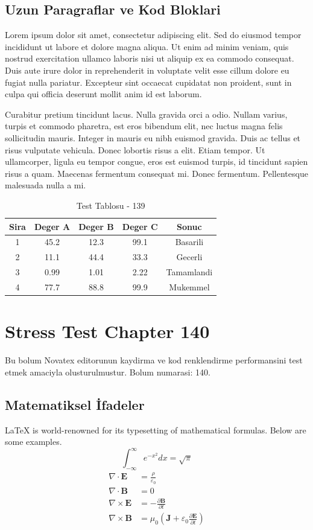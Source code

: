 \documentclass[12pt,a4paper]{article}
\begin{document}
\subsection{Uzun Paragraflar ve Kod Bloklari}
Lorem ipsum dolor sit amet, consectetur adipiscing elit. Sed do eiusmod tempor incididunt ut labore et dolore magna aliqua. Ut enim ad minim veniam, quis nostrud exercitation ullamco laboris nisi ut aliquip ex ea commodo consequat. Duis aute irure dolor in reprehenderit in voluptate velit esse cillum dolore eu fugiat nulla pariatur. Excepteur sint occaecat cupidatat non proident, sunt in culpa qui officia deserunt mollit anim id est laborum.

Curabitur pretium tincidunt lacus. Nulla gravida orci a odio. Nullam varius, turpis et commodo pharetra, est eros bibendum elit, nec luctus magna felis sollicitudin mauris. Integer in mauris eu nibh euismod gravida. Duis ac tellus et risus vulputate vehicula. Donec lobortis risus a elit. Etiam tempor. Ut ullamcorper, ligula eu tempor congue, eros est euismod turpis, id tincidunt sapien risus a quam. Maecenas fermentum consequat mi. Donec fermentum. Pellentesque malesuada nulla a mi.

\begin{table}[h!]
\centering
\begin{tabular}{|c|c|c|c|c|}
\hline
\textbf{Sira} & \textbf{Deger A} & \textbf{Deger B} & \textbf{Deger C} & \textbf{Sonuc} \\
\hline
1 & 45.2 & 12.3 & 99.1 & Basarili \\
2 & 11.1 & 44.4 & 33.3 & Gecerli \\
3 & 0.99 & 1.01 & 2.22 & Tamamlandi \\
4 & 77.7 & 88.8 & 99.9 & Mukemmel \\
\hline
\end{tabular}
\caption{Test Tablosu - 139}
\end{table}

\newpage
\section{Stress Test Chapter 140}
Bu bolum Novatex editorunun kaydirma ve kod renklendirme performansini test etmek amaciyla olusturulmustur. Bolum numarasi: 140.

\subsection{Matematiksel İfadeler}
\LaTeX{} is world-renowned for its typesetting of mathematical formulas. Below are some examples.
\begin{equation}
\int_{-\infty}^{\infty} e^{-x^2} dx = \sqrt{\pi}
\end{equation}
\begin{align}
\nabla \cdot \mathbf{E} &= \frac{\rho}{\varepsilon_0} \\
\nabla \cdot \mathbf{B} &= 0 \\
\nabla \times \mathbf{E} &= -\frac{\partial \mathbf{B}}{\partial t} \\
\nabla \times \mathbf{B} &= \mu_0\left(\mathbf{J} + \varepsilon_0 \frac{\partial \mathbf{E}}{\partial t}\right)
\end{align}
\end{document}
